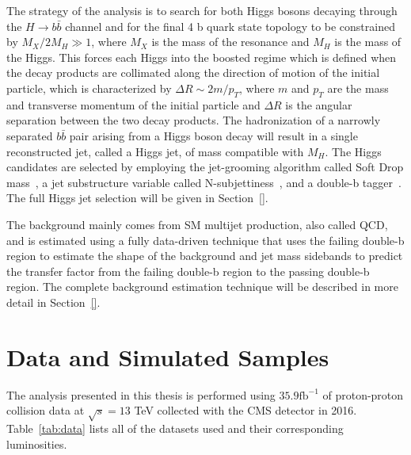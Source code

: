 The strategy of the analysis is to search for both Higgs bosons decaying through the $H\rightarrow b\bar{b}$ channel and for the final 4 b quark state topology to be constrained by $M_{X}/2M_{H}\gg 1$, where $M_{X}$ is the mass of the resonance and $M_{H}$ is the mass of the Higgs. This forces each Higgs into the boosted regime which is defined when the decay products are collimated along the direction of motion of the initial particle, which is characterized by $\Delta R \sim 2m/p_{T}$, where $m$ and $p_{T}$ are the mass and transverse momentum of the initial particle and $\Delta R$ is the angular separation between the two decay products. The hadronization of a narrowly separated $b\bar{b}$ pair arising from a Higgs boson decay will result in a single reconstructed jet, called a Higgs jet, of mass compatible with $M_{H}$. The Higgs candidates are selected by employing the jet-grooming algorithm called Soft Drop mass~\cite{JetMass, SoftDrop}, a jet substructure variable called N-subjettiness~\cite{BoostNsub, BoostTop}, and a double-b tagger~\cite{DoubleB}. The full Higgs jet selection will be given in Section~\ref{}.

The background mainly comes from SM multijet production, also called QCD, and is estimated using a fully data-driven technique that uses the failing double-b region to estimate the shape of the background and jet mass sidebands to predict the transfer factor from the failing double-b region to the passing double-b region. The complete background estimation technique will be described in more detail in Section~\ref{}.

\section{Data and Simulated Samples}
\label{sec:Samples}

The analysis presented in this thesis is performed using $35.9 \mathrm{fb}^{-1}$ of proton-proton collision data at $\sqrt{s}=13$ TeV collected with the CMS detector in 2016. Table~\ref{tab:data} lists all of the datasets used and their corresponding luminosities.

